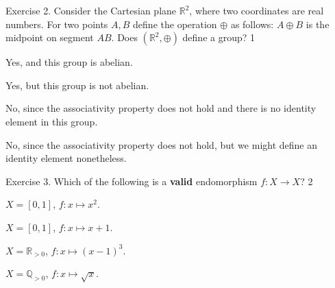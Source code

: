 \documentclass[../lecture-notes-148x210.tex]{subfiles}
\begin{document}
\begin{xexercise}
    {Exercise 2.}
    {Consider the Cartesian plane $\mathbb{R}^2$, where two coordinates are real numbers. For two points $A,B$ 
    define the operation $\oplus$ as follows: $A \oplus B$ is the midpoint on segment $AB$. Does 
    $(\mathbb{R}^2, \oplus)$ define a group?}
    {1}
    {
        \item Yes, and this group is abelian.
        \item Yes, but this group is not abelian.
        \item No, since the associativity property does not hold and there is no identity element in this group.
        \item No, since the associativity property does not hold, but we might define an identity element nonetheless.
    }
\end{xexercise}

\begin{xexercise}
    {Exercise 3.}
    {Which of the following is a \textbf{valid} endomorphism $f: X \to X$? }
    {2}
    {
        \item $X = [0,1]$, $f: x \mapsto x^2$.
        \item $X = [0,1]$, $f: x \mapsto x + 1$.
        \item $X = \mathbb{R}_{>0}$, $f: x \mapsto (x-1)^3$.
        \item $X = \mathbb{Q}_{>0}$, $f: x \mapsto \sqrt{x}$.
    }
\end{xexercise}
\end{document}

